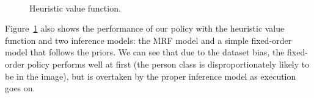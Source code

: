 \begin{figure}[h!]
\centering
{} \\
  \caption{Heuristic value function.}
  \label{fig:results_manual}
\end{figure}

Figure~\ref{fig:results_manual} also shows the performance of our policy with the heuristic value function and two inference models: the MRF model and a simple fixed-order model that follows the priors.
We can see that due to the dataset bias, the fixed-order policy performs well at first (the person class is disproportionately likely to be in the image), but is overtaken by the proper inference model as execution goes on.

